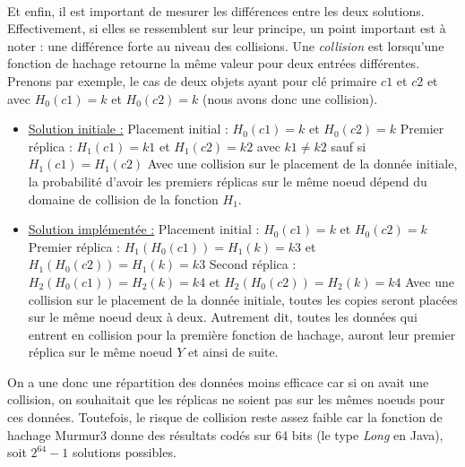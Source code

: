\documentclass[12pt]{article}
\begin{document}
\paragraph{}Et enfin, il est important de mesurer les différences entre les deux solutions. Effectivement, si elles se ressemblent sur leur principe, un point important est à noter : une différence forte au niveau des collisions. Une \textit{collision} est lorsqu'une fonction de hachage retourne la même valeur pour deux entrées différentes. \newline
Prenons par exemple, le cas de deux objets ayant pour clé primaire $c1$ et $c2$ et avec $ H_0 (c1) = k $ et $ H_0 (c2) = k $ (nous avons donc une collision).
\begin{itemize}
    \item \underline{Solution initiale :} \newline
        Placement initial : $ H_0 (c1) = k $ et $ H_0 (c2) = k $ \newline
        Premier réplica : $ H_1 (c1) = k1 $ et $ H_1 (c2) = k2 $ avec $ k1 \neq k2 $ sauf si $ H_1 (c1) = H_1 (c2) $ \newline 
        Avec une collision sur le placement de la donnée initiale, la probabilité d'avoir les premiers réplicas sur le même noeud dépend du domaine de collision de la fonction $ H_1 $.


    \item \underline{Solution implémentée :} \newline
        Placement initial : $ H_0 (c1) = k $ et $ H_0 (c2) = k $ \newline
        Premier réplica : $ H_1 (H_0 (c1)) = H_1(k) = k3 $ et $ H_1 (H_0 (c2)) = H_1(k) = k3 $ \newline
        Second réplica : $ H_2 (H_0 (c1)) = H_2 (k) = k4 $ et $ H_2 (H_0 (c2)) = H_2 (k) = k4 $ \newline
        Avec une collision sur le placement de la donnée initiale, toutes les copies seront placées sur le même noeud deux à deux. \newline
        Autrement dit, toutes les données qui entrent en collision pour la première fonction de hachage, auront leur premier réplica sur le même noeud $Y$ et ainsi de suite.

\end{itemize}

On a une donc une répartition des données moins efficace car si on avait une collision, on souhaitait que les réplicas ne soient pas sur les mêmes noeuds pour ces données. Toutefois, le risque de collision reste assez faible car la fonction de hachage Murmur3 donne des résultats codés sur 64 bits (le type \textit{Long} en Java), soit $2^{64}-1$ solutions possibles.
\end{document}
